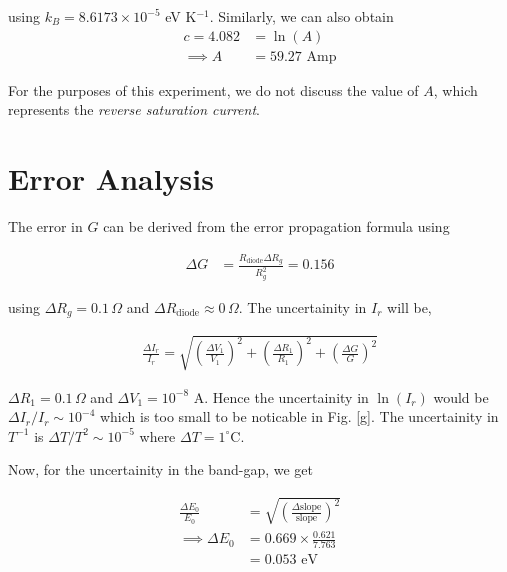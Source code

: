 \noindent using $k_B = 8.6173 \times 10^{-5}$ eV K$^{-1}$.
Similarly, we can also obtain
\begin{align*}
    c = 4.082 &= \ln(A)\\
    \implies A &= 59.27 \text{ Amp}
\end{align*}

For the purposes of this experiment, we do not discuss the value of $A$, which represents the \textit{reverse saturation current}.
\vspace{-1em}
\section{Error Analysis}

The error in $G$ can be derived from the error propagation formula using

\begin{align*}
    \Delta G &= \frac{R_\text{diode}\Delta R_g}{R_g^2} = 0.156 \nonumber
\end{align*}

\noindent using $\Delta R_g = 0.1\,\Omega$ and $\Delta R_\text{diode} \approx 0\,\Omega$. The uncertainity in $I_r$ will be,

\begin{align}
    \frac{\Delta I_r}{I_r} = \sqrt{\left(\frac{\Delta V_1}{V_1}\right)^2 + \left(\frac{\Delta R_1}{R_1}\right)^2 + \left(\frac{\Delta G}{G}\right)^2}
\end{align}

\noindent $\Delta R_1 = 0.1\,\Omega$ and $\Delta V_1 = 10^{-8}$ A. Hence the uncertainity in $\ln(I_r)$ would be $\Delta I_r/I_r \sim 10^{-4}$ which is too small to be noticable in Fig. \ref{g}. The uncertainity in $T^{-1}$ is $\Delta T/T^2 \sim 10^{-5}$ where $\Delta T = 1^\circ$C.

Now, for the uncertainity in the band-gap, we get

\begin{align}
    \frac{\Delta E_0}{E_0} &= \sqrt{\left(\frac{\Delta \text{slope}}{\text{slope}}\right)^2}\\
    \implies \Delta E_0 &= 0.669 \times \frac{0.621}{7.763}\nonumber\\
    &= 0.053 \text{ eV}\nonumber
\end{align}